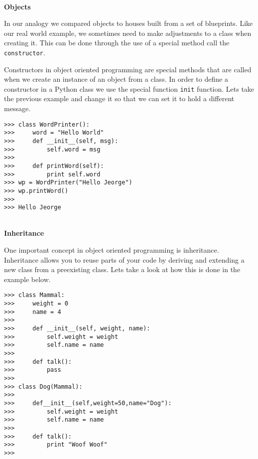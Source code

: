 \documentclass[letterpaper,11pt]{article}
\begin{document}
\\
\textbf{Objects}
\par{In our analogy we compared objects to houses built from a set of
blueprints.  Like our real world example, we sometimes need to make adjustments
to a class when creating it. This can be done through the use of a special
method call the \texttt{constructor}.}
\par{Constructors in object oriented programming are special methods that are
    called when we create an instance of an object from a class. In order to
    define a constructor in a Python class we use the special function \texttt{init}
    function.  Lets take the previous example and change it so that we can set
it to hold a different message.}
\\
\begin{minipage}{.5\textwidth}
    \begin{tcolorbox}
        \begin{footnotesize}
            \begin{verbatim}
>>> class WordPrinter():
>>>     word = "Hello World"
>>>     def __init__(self, msg):
>>>         self.word = msg
>>>
>>>     def printWord(self):
>>>         print self.word
>>> wp = WordPrinter("Hello Jeorge")
>>> wp.printWord()
>>>
>>> Hello Jeorge
            \end{verbatim}
        \end{footnotesize}
    \end{tcolorbox}
\end{minipage}
\\
\textbf{Inheritance}
\par{One important concept in object oriented programming is inheritance.
Inheritance allows you to reuse parts of your code by deriving and extending a
new class from a preexisting class. Lets take a look at how this is done in the
example below.}
\\
\begin{minipage}{.5\textwidth}
    \begin{tcolorbox}
        \begin{footnotesize}
            \begin{verbatim}
>>> class Mammal:
>>>     weight = 0
>>>     name = 4
>>>
>>>     def __init__(self, weight, name):
>>>         self.weight = weight
>>>         self.name = name
>>>
>>>     def talk():
>>>         pass
>>>
>>> class Dog(Mammal):
>>>
>>>     def__init__(self,weight=50,name="Dog"):
>>>         self.weight = weight
>>>         self.name = name
>>>
>>>     def talk():
>>>         print "Woof Woof"
>>>
                \end{verbatim}
            \end{footnotesize}
        \end{tcolorbox}
    \end{minipage}
\end{document}
